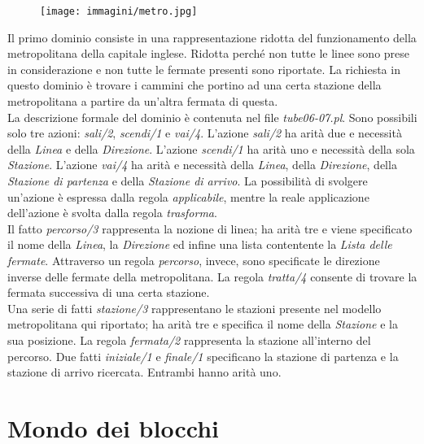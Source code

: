 \documentclass[12pt]{report}
\begin{document}
\begin{figure}[!ht]
   \centering
   \texttt{[image: immagini/metro.jpg]}
   \caption{}
   \centering
   \label{label: linea della metropolitana di Londra}
\end{figure}

Il primo dominio consiste in una rappresentazione ridotta del funzionamento della metropolitana della capitale inglese.
Ridotta perché non tutte le linee sono prese in considerazione e non tutte le fermate presenti sono riportate.
La richiesta in questo dominio è trovare i cammini che portino ad una certa stazione della metropolitana a partire da un'altra fermata di questa.\\
La descrizione formale del dominio è contenuta nel file \emph{tube06-07.pl}.
Sono possibili solo tre azioni: \emph{sali/2},\emph{ scendi/1} e \emph{vai/4}.
L'azione \emph{sali/2} ha arit\`a due e necessit\`a della \emph{Linea} e della \emph{Direzione}.
L'azione \emph{scendi/1} ha arit\`a uno e necessit\`a della sola \emph{Stazione}.
L'azione \emph{vai/4} ha arit\`a e necessit\`a della \emph{Linea}, della \emph{Direzione}, della \emph{Stazione di partenza} e della \emph{Stazione di arrivo}.
La possibilit\`a di svolgere un'azione \`e espressa dalla regola \emph{applicabile}, mentre la reale applicazione dell'azione è svolta dalla regola \emph{trasforma}.\\
Il fatto \emph{percorso/3} rappresenta la nozione di linea; ha arit\`a tre e viene specificato il nome della \emph{Linea}, la \emph{Direzione} ed infine una lista contentente la \emph{Lista delle fermate}. Attraverso un regola \emph{percorso}, invece, sono specificate le direzione inverse delle fermate della metropolitana.
La regola \emph{tratta/4} consente di trovare la fermata successiva di una certa stazione.\\
Una serie di fatti \emph{stazione/3} rappresentano le stazioni presente nel modello metropolitana qui riportato; ha arit\`a tre e specifica il nome della \emph{Stazione} e la sua posizione.
La regola \emph{fermata/2} rappresenta la stazione all'interno del percorso.
Due fatti \emph{iniziale/1} e \emph{finale/1} specificano la stazione di partenza e la stazione di arrivo ricercata. Entrambi hanno arit\`a uno.

\section{Mondo dei blocchi}
\end{document}
